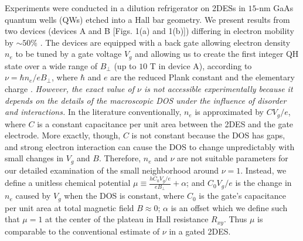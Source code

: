 \documentclass
[aps,prl,twocolumn,superscriptaddress,showpacs,floatfix]{revtex4-1}%
\begin{document}
Experiments were conducted in a dilution refrigerator on 2DESs in $15$-nm GaAs quantum wells (QWs) etched into a Hall bar geometry. We present results from two devices (devices A and B [Figs. 1(a) and 1(b)]) differing in electron mobility by ${\sim}50\%$ \cite{SI}. The devices are equipped with a back gate allowing electron density $n_e$ to be tuned by a gate voltage $V_g$ and allowing us to create the first integer QH state over a wide range of $B_{\perp}$ (up to $10$ T in device A), according to $\nu={\hbar}n_e/eB_{\perp}$, where $\hbar$ and $e$ are the reduced Plank constant and the elementary charge \cite{note4}. \textit{However, the exact value of $\nu$ is not accessible experimentally because it depends on the details of the macroscopic DOS under the influence of disorder and interactions.} In the literature conventionally, $n_e$ is approximated by $CV_g/e$, where $C$ is a constant capacitance per unit area between the 2DES and the gate electrode. More exactly, though, $C$ is not constant because the DOS has gaps, and strong electron interaction can cause the DOS to change unpredictably with small changes in $V_g$ and $B$. Therefore, $n_e$ and $\nu$ are not suitable parameters for our detailed examination of the small neighborhood around $\nu=1$. Instead, we define a unitless chemical potential $\mu\equiv\frac{hC_0V_{g}/e}{eB_{\perp}}+\alpha$; and $C_0V_{g}/e$ is the change in $n_e$ caused by $V_{g}$ when the DOS is constant, where $C_0$ is the gate's capacitance per unit area at total magnetic field $B\approx0$; $\alpha$ is an offset which we define such that $\mu=1$ at the center of the plateau in Hall resistance $R_{xy}$. Thus $\mu$ is comparable to the conventional estimate of $\nu$ in a gated 2DES.
\end{document}
